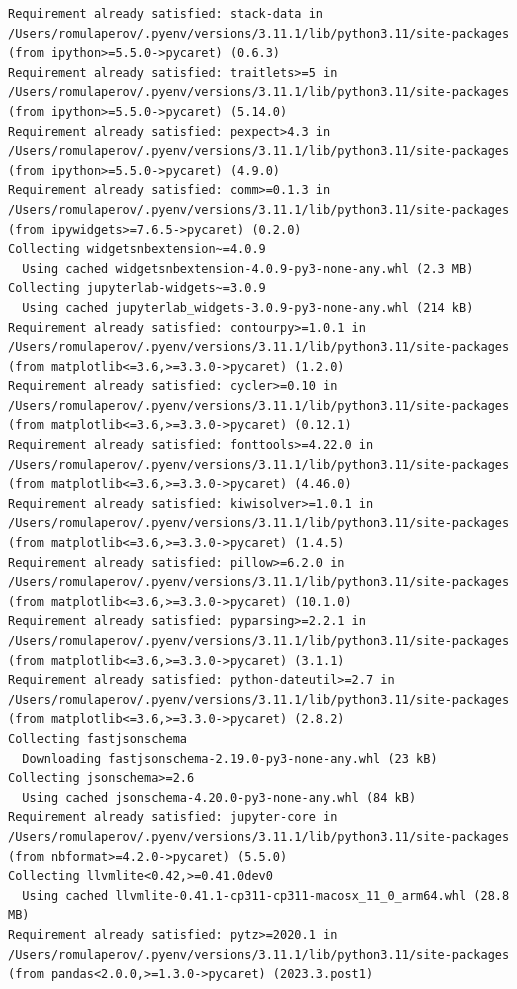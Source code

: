\documentclass[
  letterpaper,
  DIV=11,
  numbers=noendperiod]{scrartcl}
\begin{document}
\begin{verbatim}
Requirement already satisfied: stack-data in /Users/romulaperov/.pyenv/versions/3.11.1/lib/python3.11/site-packages (from ipython>=5.5.0->pycaret) (0.6.3)
Requirement already satisfied: traitlets>=5 in /Users/romulaperov/.pyenv/versions/3.11.1/lib/python3.11/site-packages (from ipython>=5.5.0->pycaret) (5.14.0)
Requirement already satisfied: pexpect>4.3 in /Users/romulaperov/.pyenv/versions/3.11.1/lib/python3.11/site-packages (from ipython>=5.5.0->pycaret) (4.9.0)
Requirement already satisfied: comm>=0.1.3 in /Users/romulaperov/.pyenv/versions/3.11.1/lib/python3.11/site-packages (from ipywidgets>=7.6.5->pycaret) (0.2.0)
Collecting widgetsnbextension~=4.0.9
  Using cached widgetsnbextension-4.0.9-py3-none-any.whl (2.3 MB)
Collecting jupyterlab-widgets~=3.0.9
  Using cached jupyterlab_widgets-3.0.9-py3-none-any.whl (214 kB)
Requirement already satisfied: contourpy>=1.0.1 in /Users/romulaperov/.pyenv/versions/3.11.1/lib/python3.11/site-packages (from matplotlib<=3.6,>=3.3.0->pycaret) (1.2.0)
Requirement already satisfied: cycler>=0.10 in /Users/romulaperov/.pyenv/versions/3.11.1/lib/python3.11/site-packages (from matplotlib<=3.6,>=3.3.0->pycaret) (0.12.1)
Requirement already satisfied: fonttools>=4.22.0 in /Users/romulaperov/.pyenv/versions/3.11.1/lib/python3.11/site-packages (from matplotlib<=3.6,>=3.3.0->pycaret) (4.46.0)
Requirement already satisfied: kiwisolver>=1.0.1 in /Users/romulaperov/.pyenv/versions/3.11.1/lib/python3.11/site-packages (from matplotlib<=3.6,>=3.3.0->pycaret) (1.4.5)
Requirement already satisfied: pillow>=6.2.0 in /Users/romulaperov/.pyenv/versions/3.11.1/lib/python3.11/site-packages (from matplotlib<=3.6,>=3.3.0->pycaret) (10.1.0)
Requirement already satisfied: pyparsing>=2.2.1 in /Users/romulaperov/.pyenv/versions/3.11.1/lib/python3.11/site-packages (from matplotlib<=3.6,>=3.3.0->pycaret) (3.1.1)
Requirement already satisfied: python-dateutil>=2.7 in /Users/romulaperov/.pyenv/versions/3.11.1/lib/python3.11/site-packages (from matplotlib<=3.6,>=3.3.0->pycaret) (2.8.2)
Collecting fastjsonschema
  Downloading fastjsonschema-2.19.0-py3-none-any.whl (23 kB)
Collecting jsonschema>=2.6
  Using cached jsonschema-4.20.0-py3-none-any.whl (84 kB)
Requirement already satisfied: jupyter-core in /Users/romulaperov/.pyenv/versions/3.11.1/lib/python3.11/site-packages (from nbformat>=4.2.0->pycaret) (5.5.0)
Collecting llvmlite<0.42,>=0.41.0dev0
  Using cached llvmlite-0.41.1-cp311-cp311-macosx_11_0_arm64.whl (28.8 MB)
Requirement already satisfied: pytz>=2020.1 in /Users/romulaperov/.pyenv/versions/3.11.1/lib/python3.11/site-packages (from pandas<2.0.0,>=1.3.0->pycaret) (2023.3.post1)

\end{verbatim}
\end{document}
